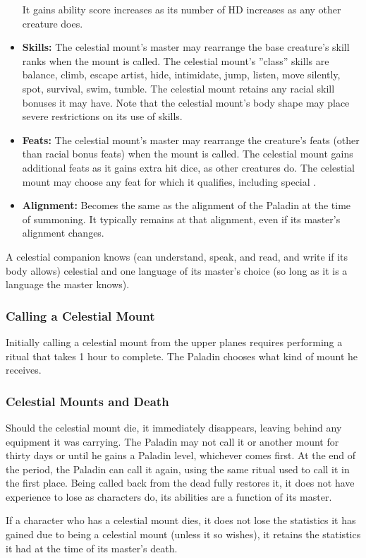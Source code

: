 \begin{itemize}
 It gains ability score increases as its number of HD increases as any other creature does.
 \item \textbf{Skills:} The celestial mount's master may rearrange the base creature's skill ranks when the mount is called. 
 The celestial mount's ''class'' skills are balance, climb, escape artist, hide, intimidate, jump, listen, move silently, spot, survival, swim, tumble. 
 The celestial mount retains any racial skill bonuses it may have.
 Note that the celestial mount's body shape may place severe restrictions on its use of skills.
 \item \textbf{Feats:} The celestial mount's master may rearrange the creature's feats (other than racial bonus feats) when the mount is called.
 The celestial mount gains additional feats as it gains extra hit dice, as other creatures do. 
 The celestial mount may choose any feat for which it qualifies, including special .
 \item \textbf{Alignment:} Becomes the same as the alignment of the Paladin at the time of summoning. 
 It typically remains at that alignment, even if its master's alignment changes.
\end{itemize}
A celestial companion knows (can understand, speak, and read, and write if its body allows) 
celestial and one language of its master's choice (so long as it is a language the master knows). 
\subsubsection{Calling a Celestial Mount}
Initially calling a celestial mount from the upper planes requires performing a ritual that takes 1 hour to complete.
The Paladin chooses what kind of mount he receives.
\subsubsection{Celestial Mounts and Death}
Should the celestial mount die, it immediately disappears, leaving behind any equipment it was carrying. 
The Paladin may not call it or another mount for thirty days or until he gains a Paladin level, whichever comes first.
At the end of the period, the Paladin can call it again, using the same ritual used to call it in the first place.
Being called back from the dead fully restores it, it does not have experience to lose as characters do, its abilities are a function of its master.

If a character who has a celestial mount dies, 
it does not lose the statistics it has gained due to being a celestial mount (unless it so wishes), 
it retains the statistics it had at the time of its master's death.

